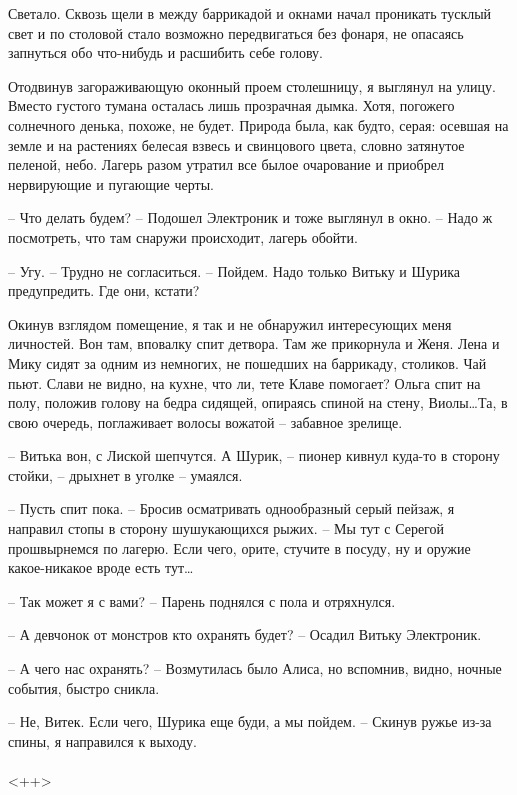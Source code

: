 \documentclass[a4paper]{book}
\begin{document}
Светало. Сквозь щели в между баррикадой и окнами начал проникать тусклый свет и по столовой стало возможно передвигаться без фонаря, не опасаясь запнуться обо что-нибудь и расшибить себе голову.

Отодвинув загораживающую оконный проем столешницу, я выглянул на улицу. Вместо густого тумана осталась лишь прозрачная дымка. Хотя, погожего солнечного денька, похоже, не будет. Природа была, как будто, серая: осевшая на земле и на растениях белесая взвесь и свинцового цвета, словно затянутое пеленой, небо. Лагерь разом утратил все былое очарование и приобрел нервирующие и пугающие черты. 

-- Что делать будем? -- Подошел Электроник и тоже выглянул в окно. -- Надо ж посмотреть, что там снаружи происходит, лагерь обойти.

-- Угу. -- Трудно не согласиться. -- Пойдем. Надо только Витьку и Шурика предупредить. Где они, кстати?

Окинув взглядом помещение, я так и не обнаружил интересующих меня личностей. Вон там, вповалку спит детвора. Там же прикорнула и Женя. Лена и Мику сидят за одним из немногих, не пошедших на баррикаду, столиков. Чай пьют. Слави не видно, на кухне, что ли, тете Клаве помогает? Ольга спит на полу, положив голову на бедра сидящей, опираясь спиной на стену, Виолы\ldots Та, в свою очередь, поглаживает волосы вожатой -- забавное зрелище.

-- Витька вон, с Лиской шепчутся. А Шурик, -- пионер кивнул куда-то в сторону стойки, -- дрыхнет в уголке -- умаялся. 

-- Пусть спит пока. -- Бросив осматривать однообразный серый пейзаж, я направил стопы в сторону шушукающихся рыжих. -- Мы тут с Серегой прошвырнемся по лагерю. Если чего, орите, стучите в посуду, ну и оружие какое-никакое вроде есть тут\ldots

-- Так может я с вами? -- Парень поднялся с пола и отряхнулся.

-- А девчонок от монстров кто охранять будет? -- Осадил Витьку Электроник.

-- А чего нас охранять? -- Возмутилась было Алиса, но вспомнив, видно, ночные события, быстро сникла. 

-- Не, Витек. Если чего, Шурика еще буди, а мы пойдем. -- Скинув ружье из-за спины, я направился к выходу. 

\paragraph{}<++>
\end{document}
